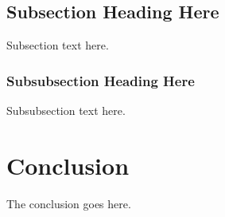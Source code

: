 \documentclass[conference]{IEEEtran}
\begin{document}
\subsection{Subsection Heading Here}
Subsection text here.


\subsubsection{Subsubsection Heading Here}
Subsubsection text here.



\section{Conclusion}
The conclusion goes here.


 

\end{document}
